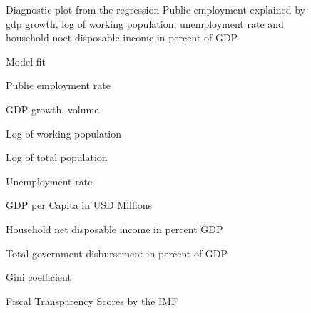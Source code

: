 \documentclass[a4paper, 10pt]{article}
\newcommand{\insertplot}[2]{
  \begin{figure}[!ht]
    \centering
    
    \caption{#2}
  \end{figure}
}
\begin{document}
%     
\begin{landscape}

  \insertplot{model_diagnostic.tex}{Diagnostic plot from the regression
    Public employment explained by gdp growth, log of working population,
    unemployment rate and household noet disposable income in percent of GDP}
  \insertplot{model_fit_quality.tex}{Model fit}

  \insertplot{simple_model_egr.tex}{Public employment rate}
  \insertplot{simple_model_gdpv_annpct.tex}{GDP growth, volume}
  \insertplot{simple_model_lpop.tex}{Log of working population}
  \insertplot{simple_model_lpoptot.tex}{Log of total population}
  \insertplot{simple_model_unr.tex}{Unemployment rate}
  \insertplot{simple_model_gdp_per_capita.tex}{GDP per Capita in USD Millions}
  \insertplot{simple_model_ydrh_to_gdpv.tex}{Household net disposable income in percent
    GDP}
  \insertplot{simple_model_ypgtq.tex}{Total government disbursement in
    percent of GDP}
  \insertplot{simple_model_incomeineq.tex}{Gini coefficient}
  \insertplot{simple_model_fiscal_transparency.tex}{Fiscal Transparency Scores
    by the IMF}


\end{landscape}
\end{document}
